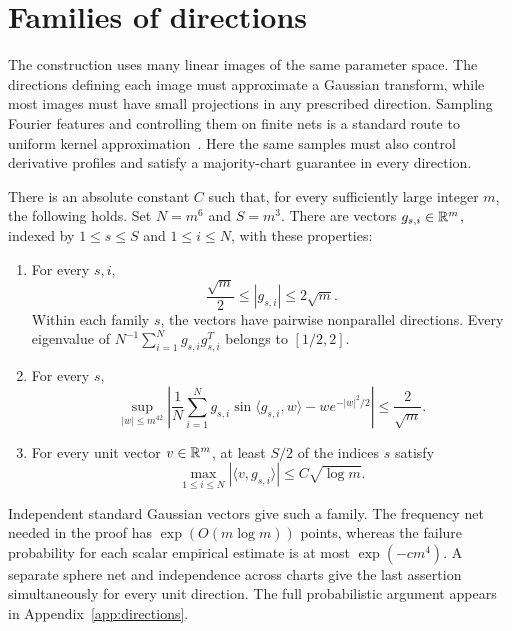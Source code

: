 \section{Families of directions}
\label{dir:section}

The construction uses many linear images of the same parameter space.  The
directions defining each image must approximate a Gaussian transform, while
most images must have small projections in any prescribed direction.
Sampling Fourier features and controlling them on finite nets is a standard
route to uniform kernel approximation~\cite{RR07}. Here the same samples
must also control derivative profiles and satisfy a majority-chart
guarantee in every direction.

\begin{lemma}\label{lem:directions}
There is an absolute constant $C$ such that, for every sufficiently large
integer $m$, the following holds.  Set $N=m^6$ and $S=m^3$.  There are vectors
$g_{s,i}\in\mathbb R^m$, indexed by $1\le s\le S$ and $1\le i\le N$, with these
properties:
\begin{enumerate}
\item For every $s,i$,
\begin{equation}\label{dir:norms}
 \frac{\sqrt m}{2}\le |g_{s,i}|\le 2\sqrt m.
\end{equation}
Within each family $s$, the vectors have pairwise nonparallel directions.
Every eigenvalue of $N^{-1}\sum_{i=1}^N g_{s,i}g_{s,i}^{T}$ belongs to
$[1/2,2]$.
\item For every $s$,
\begin{equation}\label{dir:gaussian-approximation}
 \sup_{|w|\le m^{42}}
 \left|\frac1N\sum_{i=1}^N
 g_{s,i}\sin\langle g_{s,i},w\rangle
       -w e^{-|w|^2/2}\right|
 \le \frac{2}{\sqrt m}.
\end{equation}
\item For every unit vector $v\in\mathbb R^m$, at least $S/2$ of the indices $s$
satisfy
\begin{equation}\label{dir:good-charts}
 \max_{1\le i\le N}|\langle v,g_{s,i}\rangle|
 \le C\sqrt{\log m}.
\end{equation}
\end{enumerate}
\end{lemma}

Independent standard Gaussian vectors give such a family. The frequency
net needed in the proof has $\exp(O(m\log m))$ points, whereas the
failure probability for each scalar empirical estimate is at most
$\exp(-cm^4)$. A separate sphere net and independence across charts give
the last assertion simultaneously for every unit direction. The full
probabilistic argument appears in Appendix~\ref{app:directions}.


